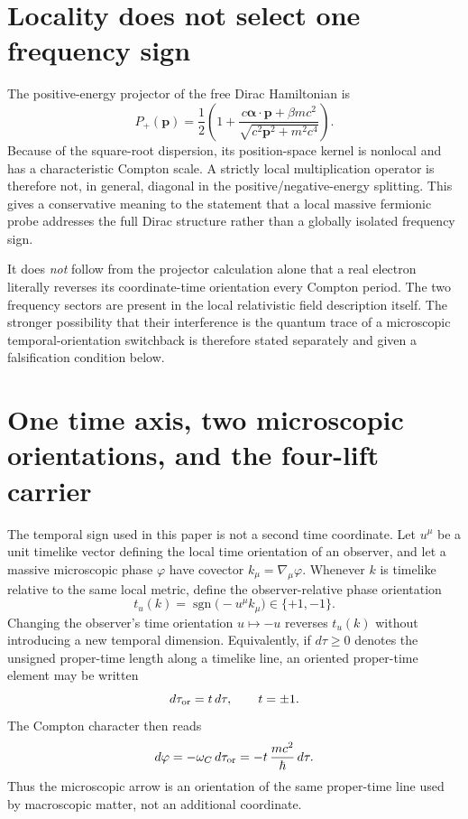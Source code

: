 \documentclass[11pt]{article}
\newcommand{\sgn}{\operatorname{sgn}}
\theoremstyle{definition}\newtheorem{definition}[theorem]{Definition}
\theoremstyle{remark}\newtheorem{remark}[theorem]{Remark}\newtheorem{conjecture}[theorem]{Conjecture}
\begin{document}
\section{Locality does not select one frequency sign}
The positive-energy projector of the free Dirac Hamiltonian is
\begin{equation}
 P_+(\bm p)=\frac12\left(1+\frac{c\bm\alpha\cdot\bm p+\beta mc^2}{\sqrt{c^2\bm p^2+m^2c^4}}\right).
\end{equation}
Because of the square-root dispersion, its position-space kernel is nonlocal and has a characteristic Compton scale. A strictly local multiplication operator is therefore not, in general, diagonal in the positive/negative-energy splitting. This gives a conservative meaning to the statement that a local massive fermionic probe addresses the full Dirac structure rather than a globally isolated frequency sign.

It does \emph{not} follow from the projector calculation alone that a real electron literally reverses its coordinate-time orientation every Compton period. The two frequency sectors are present in the local relativistic field description itself. The stronger possibility that their interference is the quantum trace of a microscopic temporal-orientation switchback is therefore stated separately and given a falsification condition below.


\section{One time axis, two microscopic orientations, and the four-lift carrier}\label{sec:fourlift}
The temporal sign used in this paper is not a second time coordinate. Let $u^\mu$ be a unit timelike vector defining the local time orientation of an observer, and let a massive microscopic phase $\varphi$ have covector $k_\mu=\nabla_\mu\varphi$. Whenever $k$ is timelike relative to the same local metric, define the observer-relative phase orientation
\begin{equation}\label{eq:tphasecovariant}
 \boxed{t_u(k)=\sgn\!\bigl(-u^\mu k_\mu\bigr)\in\{+1,-1\}.}
\end{equation}
Changing the observer's time orientation $u\mapsto-u$ reverses $t_u(k)$ without introducing a new temporal dimension. Equivalently, if $d\tau\ge0$ denotes the unsigned proper-time length along a timelike line, an oriented proper-time element may be written
\begin{equation}\label{eq:orientedpropertime}
 d\tau_{\rm or}=t\,d\tau,\qquad t=\pm1.
\end{equation}
The Compton character then reads
\begin{equation}\label{eq:orientedComptonphase}
 d\varphi=-\omega_C\,d\tau_{\rm or}
 =-t\,\frac{mc^2}{\hbar}\,d\tau.
\end{equation}
Thus the microscopic arrow is an orientation of the same proper-time line used by macroscopic matter, not an additional coordinate.
\end{document}
